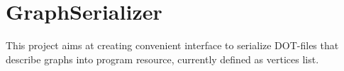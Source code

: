 \chapter{Graph\+Serializer}
\hypertarget{md__r_e_a_d_m_e}{}\label{md__r_e_a_d_m_e}
\label{md__r_e_a_d_m_e_autotoc_md0}%
%


This project aims at creating convenient interface to serialize DOT-\/files that describe graphs into program resource, currently defined as vertices list. 